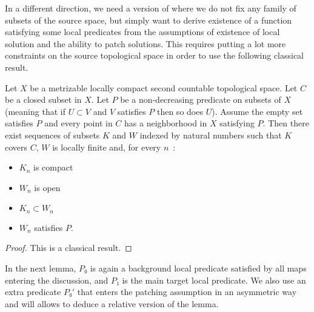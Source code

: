 In a different direction, we need a version of  where
we do not fix any family of subsets of the source space, but simply want to derive existence
of a function satisfying some local predicates from the assumptions of
existence of local solution and the ability to patch solutions. This requires putting a lot
more constraints on the source topological space in order to use the following classical
result.

\begin{lemma}
  \label{lem:exists_locally_finite_subcover_of_locally}
  \leanok
  Let $X$ be a metrizable locally compact second countable topological space.
  Let $C$ be a closed subset in $X$. Let $P$ be a non-decreasing predicate on subsets
  of $X$ (meaning that if $U ⊂ V$ and $V$ satisfies $P$ then so does $U$). Assume
  the empty set satisfies $P$ and every point in $C$ has a neighborhood in $X$
  satisfying $P$. Then there exist sequences of subsets $K$ and $W$ indexed by
  natural numbers such that $K$ covers $C$, $W$ is locally finite and, for every $n$~:
  \begin{itemize}
    \item $K_n$ is compact
    \item $W_n$ is open
    \item $K_n ⊂ W_n$
    \item $W_n$ satisfies $P$.
  \end{itemize}
\end{lemma}

\begin{proof}
  \leanok
  This is a classical result.
\end{proof}

In the next lemma, $P₀$ is again a background local predicate satisfied by all
maps entering the discussion, and $P₁$ is the main target local predicate. We also use
an extra predicate $P₀'$ that enters the patching assumption in an asymmetric way
and will allows to deduce a relative version of the lemma.

